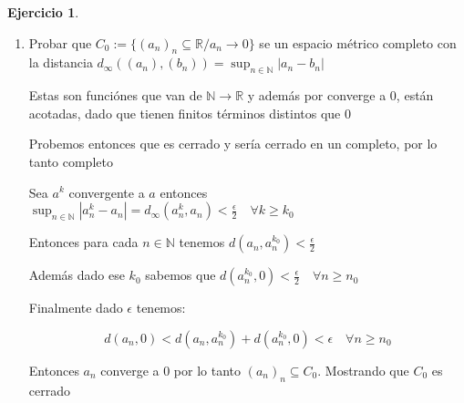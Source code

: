 \documentclass[11pt]{report}
\newcommand{\R}{\mathbb{R}}
\newcommand{\N}{\mathbb{N}}
\newcommand{\ra}{\rightarrow}
\theoremstyle{definition}
\newtheorem*{remark}{Observación}
\newtheorem{ej}{Ejercicio}
\begin{document}
\begin{ej}
\begin{enumerate}
\begin{proof}
\begin{remark}
					Entonces $f$ es contínua en $x_0$ y esto lo podemos hacer para cualquier $x_0 \in X$


				Ahora usando aquél delta tenemos $d(x,x_0) < \delta$ implica:
				$$ d(f(x),f(x_0)) < d(f(x),f_{n_0}(x)) + d(f_{n_0}(x),f_{n_0}(x_0)) + d(f_{n_0}(x_0),f(x_0)) $$
				\end{remark}
				\end{proof}
				
				
			\item Probar que $C_0 := \{(a_n)_n \subseteq \R / a_n \ra 0 \}$ se un espacio métrico completo con la distancia $d_{\infty}((a_n),(b_n)) = \sup_{n\in\N} |a_n-b_n|$

				Estas son funciónes que van de $\N \ra \R$ y además por converge a 0, están acotadas, dado que tienen finitos términos distintos que 0

				Probemos entonces que es cerrado y sería cerrado en un completo, por lo tanto completo

				Sea $a^k $ convergente a $a$ entonces $\sup_{n \in \N}|a^{k}_n - a_n|=  d_{\infty}(a^k_n,a_n) < \frac{\epsilon}{2} \quad \forall k\geq k_0$
				
				Entonces para cada $n \in \N$ tenemos $d(a_n,a^{k_0}_n) < \frac{\epsilon}{2}$
			
				Además dado ese $k_0$ sabemos que $d(a^{k_0}_n , 0 ) < \frac{\epsilon}{2} \quad \forall n \geq n_0$

				Finalmente dado $\epsilon$ tenemos:

			$$ d(a_n,0) < d(a_n,a^{k_0}_n) + d(a^{k_0}_n , 0) < \epsilon \quad \forall n\geq n_0$$

			Entonces $a_n$ converge a 0 por lo tanto $(a_n)_n \subseteq C_0$. Mostrando que $C_0$ es cerrado
		\end{enumerate}
	\end{ej}
\end{document}
